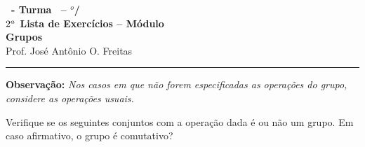 \documentclass[12pt]{exam}
\begin{document}
    \begin{center}
    {\Large\bf \disciplina\ - Turma \turma\ -- \semestre$^{o}$/\ano} \\ \vspace{9pt} {\large\bf
        $2^a$ Lista de Exercícios -- Módulo \numeromodulo\\ Grupos}\\ \vspace{9pt} Prof. José Antônio O. Freitas
    \end{center}
    \hrule

    \vspace{.6cm}

    \textbf{Observação: }\textit{Nos casos em que não forem especificadas as operações do grupo, considere as operações usuais.}

    \vspace{.6cm}
    \questao{} Verifique se os seguintes conjuntos com a operação dada é ou não um grupo. Em caso afirmativo, o grupo é comutativo?
\end{document}
